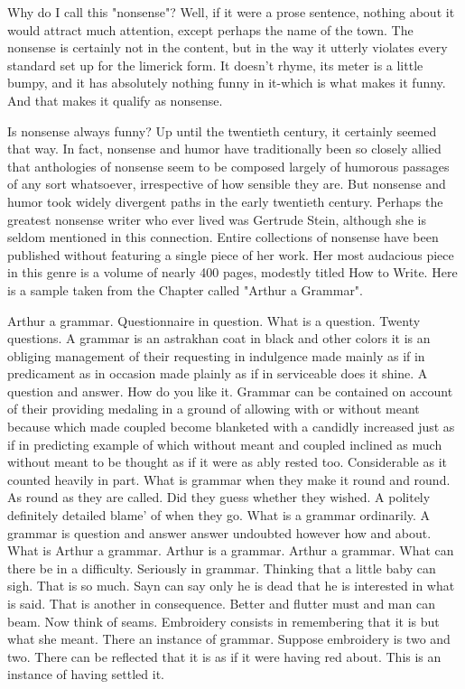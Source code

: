 Why do I call this "nonsense"? Well, if it were a prose sentence, nothing about it would
attract much attention, except perhaps the name of the town. The nonsense is certainly
not in the content, but in the way it utterly violates every standard set up for the limerick
form. It doesn't rhyme, its meter is a little bumpy, and it has absolutely nothing funny in
it-which is what makes it funny. And that makes it qualify as nonsense.





        Is nonsense always funny? Up until the twentieth century, it certainly seemed that
way. In fact, nonsense and humor have traditionally been so closely allied that
anthologies of nonsense seem to be composed largely of
humorous passages of any sort whatsoever, irrespective of how sensible they are. But
nonsense and humor took widely divergent paths in the early
twentieth century. Perhaps the greatest nonsense writer who ever lived was Gertrude
Stein, although she is seldom mentioned in this connection. Entire
collections of nonsense have been published without featuring a single piece of her work.
Her most audacious piece in this genre is a volume of nearly
400 pages, modestly titled How to Write. Here is a sample taken from the Chapter called
"Arthur a Grammar".

Arthur a grammar.
Questionnaire in question.
What is a question.
Twenty questions.
A grammar is an astrakhan coat in black and other colors it is an obliging management of
their requesting in indulgence made mainly as if in predicament as in occasion made
plainly as if in serviceable does it shine.
A question and answer.
How do you like it.
Grammar can be contained on account of their providing medaling in a ground of
allowing with or without meant because which made coupled become blanketed with a
candidly increased just as if in predicting example of which without meant and coupled
inclined as much without meant to be thought as if it were as ably rested too.
Considerable as it counted heavily in part.
What is grammar when they make it round and round. As round as they are called.
Did they guess whether they wished. A politely definitely detailed blame' of when they
go.
What is a grammar ordinarily. A grammar is question and answer answer undoubted
however how and about.
What is Arthur a grammar.
Arthur is a grammar.
Arthur a grammar.
What can there be in a difficulty.
Seriously in grammar.
Thinking that a little baby can sigh.
That is so much.
Sayn can say only he is dead that he is interested in what is said. That is another in
consequence.
Better and flutter must and man can beam.
Now think of seams.
Embroidery consists in remembering that it is but what she meant. There an instance of
grammar.
Suppose embroidery is two and two. There can be reflected that it is as if it were having
red about.
This is an instance of having settled it.


